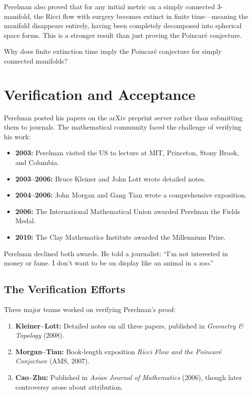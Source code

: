 Perelman also proved that for any initial metric on a simply connected 3-manifold, the Ricci flow with surgery becomes extinct in finite time---meaning the manifold disappears entirely, having been completely decomposed into spherical space forms. This is a stronger result than just proving the Poincar\'{e} conjecture.

\begin{checkyou}
Why does finite extinction time imply the Poincar\'{e} conjecture for simply connected manifolds?
\end{checkyou}

\section{Verification and Acceptance}

Perelman posted his papers on the arXiv preprint server rather than submitting them to journals. The mathematical community faced the challenge of verifying his work:

\begin{itemize}
  \item \textbf{2003:} Perelman visited the US to lecture at MIT, Princeton, Stony Brook, and Columbia.
  \item \textbf{2003--2006:} Bruce Kleiner and John Lott wrote detailed notes.
  \item \textbf{2004--2006:} John Morgan and Gang Tian wrote a comprehensive exposition.
  \item \textbf{2006:} The International Mathematical Union awarded Perelman the Fields Medal.
  \item \textbf{2010:} The Clay Mathematics Institute awarded the Millennium Prize.
\end{itemize}

Perelman declined both awards. He told a journalist: ``I'm not interested in money or fame. I don't want to be on display like an animal in a zoo.''

\subsection{The Verification Efforts}

Three major teams worked on verifying Perelman's proof:
\begin{enumerate}
  \item \textbf{Kleiner--Lott:} Detailed notes on all three papers, published in \textit{Geometry \& Topology} (2008).
  \item \textbf{Morgan--Tian:} Book-length exposition \textit{Ricci Flow and the Poincar\'{e} Conjecture} (AMS, 2007).
  \item \textbf{Cao--Zhu:} Published in \textit{Asian Journal of Mathematics} (2006), though later controversy arose about attribution.
\end{enumerate}

